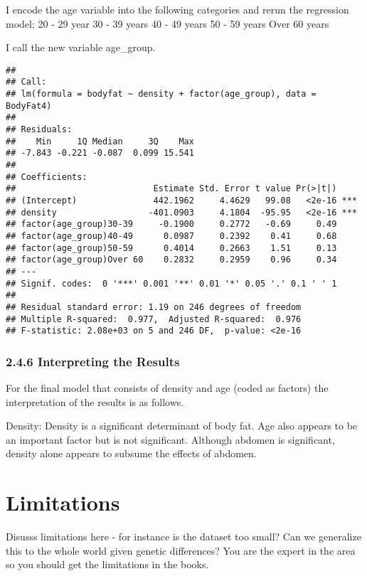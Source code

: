 \documentclass[
]{article}
\begin{document}
I encode the age variable into the following categories and rerun the
regression model; 20 - 29 year 30 - 39 years 40 - 49 years 50 - 59 years
Over 60 years

I call the new variable age\_group.

\begin{verbatim}
## 
## Call:
## lm(formula = bodyfat ~ density + factor(age_group), data = BodyFat4)
## 
## Residuals:
##    Min     1Q Median     3Q    Max 
## -7.843 -0.221 -0.087  0.099 15.541 
## 
## Coefficients:
##                           Estimate Std. Error t value Pr(>|t|)    
## (Intercept)               442.1962     4.4629   99.08   <2e-16 ***
## density                  -401.0903     4.1804  -95.95   <2e-16 ***
## factor(age_group)30-39     -0.1900     0.2772   -0.69     0.49    
## factor(age_group)40-49      0.0987     0.2392    0.41     0.68    
## factor(age_group)50-59      0.4014     0.2663    1.51     0.13    
## factor(age_group)Over 60    0.2832     0.2959    0.96     0.34    
## ---
## Signif. codes:  0 '***' 0.001 '**' 0.01 '*' 0.05 '.' 0.1 ' ' 1
## 
## Residual standard error: 1.19 on 246 degrees of freedom
## Multiple R-squared:  0.977,  Adjusted R-squared:  0.976 
## F-statistic: 2.08e+03 on 5 and 246 DF,  p-value: <2e-16
\end{verbatim}

\hypertarget{interpreting-the-results}{%
\subsubsection{\texorpdfstring{\textbf{2.4.6 Interpreting the
Results}}{2.4.6 Interpreting the Results}}\label{interpreting-the-results}}

For the final model that consists of density and age (coded as factors)
the interpretation of the results is as follows.

Density: Density is a significant determinant of body fat. Age also
appears to be an important factor but is not significant. Although
abdomen is significant, density alone appears to subsume the effects of
abdomen.

\hypertarget{limitations}{%
\section{\texorpdfstring{\textbf{Limitations}}{Limitations}}\label{limitations}}

Disusss limitations here - for instance is the dataset too small? Can we
generalize this to the whole world given genetic differences? You are
the expert in the area so you should get the limitations in the books.
\end{document}
